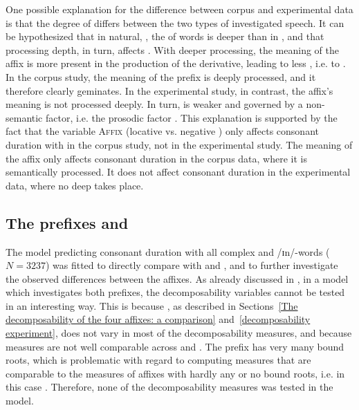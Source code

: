 One possible explanation for the difference between corpus and experimental data is that the degree of  differs between the two types of investigated speech. It can be hypothesized that in natural, ,  the  of words is deeper than in , and that processing depth, in turn, affects . With deeper processing, the meaning of the affix is more present in the production of the derivative, leading to less , i.e. to . 
 In the corpus study, the meaning of the prefix is deeply processed, and it therefore clearly geminates. In the experimental study, in contrast, the affix's meaning is not processed deeply. In turn,  is weaker and governed by a non-semantic factor,  i.e. the prosodic factor .
  This explanation is supported by the fact that the variable \textsc{Affix} (locative  vs. negative ) only affects consonant duration with  in the corpus study, not in the experimental study. The meaning of the affix only affects consonant duration in the corpus data, where it is semantically processed. It does not affect consonant duration in the experimental data, where no deep  takes place.





\subsection{The prefixes  and }
The model predicting consonant duration with all complex  and /ɪn/-words ($N=3237$) was fitted to directly compare  with  and , and to further investigate the observed differences between the affixes.
As already discussed in , in a model which investigates both prefixes, the decomposability variables cannot be tested in an interesting way. This is because , as described in Sections~\ref{The decomposability of the four affixes: a comparison} and~\ref{decomposability experiment}, does not vary in most of the decomposability measures, and because  measures are not well comparable across  and . The prefix  has very many bound roots, which is problematic with regard to computing  measures that are comparable to the  measures of affixes with hardly any or no bound roots, i.e. in this case . Therefore, none of the decomposability measures was tested in the model. 

